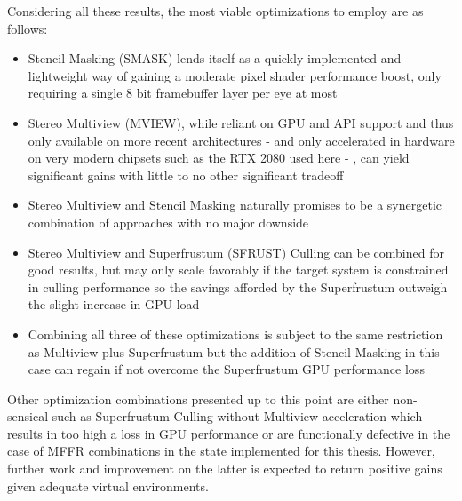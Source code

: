 Considering all these results, the most viable optimizations to employ are as follows: 
\begin{itemize}
\item Stencil Masking (SMASK) lends itself as a quickly implemented and lightweight way of gaining a moderate pixel shader performance boost, only requiring a single 8 bit framebuffer layer per eye at most
\item Stereo Multiview (MVIEW), while reliant on GPU and API support and thus only available on more recent architectures - and only accelerated in hardware on very modern chipsets such as the RTX 2080 used here - , can yield significant gains with little to no other significant tradeoff
\item Stereo Multiview and Stencil Masking naturally promises to be a synergetic combination of approaches with no major downside
\item Stereo Multiview and Superfrustum (SFRUST) Culling can be combined for good results, but may only scale favorably if the target system is constrained in culling performance so the savings afforded by the Superfrustum outweigh the slight increase in GPU load
\item Combining all three of these optimizations is subject to the same restriction as Multiview plus Superfrustum but the addition of Stencil Masking in this case can regain if not overcome the Superfrustum GPU performance loss
\end{itemize}
Other optimization combinations presented up to this point are either non-sensical such as Superfrustum Culling without Multiview acceleration which results in too high a loss in GPU performance or are functionally defective in the case of \gls{MFFR} combinations in the state implemented for this thesis. However, further work and improvement on the latter is expected to return positive gains given adequate virtual environments. 


